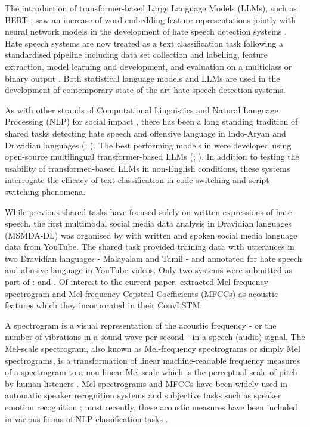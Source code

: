 \documentclass[11pt]{article}
\begin{document}
    The introduction of transformer-based Large Language Models (LLMs), such as BERT \cite{devlin_bert_2019}, saw an increase of word embedding feature representations jointly with neural network models in the development of hate speech detection systems \cite{jahan_systematic_2023}. Hate speech systems are now treated as a text classification task following a standardised pipeline including data set collection and labelling, feature extraction, model learning and development, and evaluation on a multiclass or binary output \cite{rawat_hate_2024}. Both statistical language models and LLMs are used in the development of contemporary state-of-the-art hate speech detection systems.
    
    As with other strands of Computational Linguistics and Natural Language Processing (NLP) for social impact \cite{hovy_social_2016}, there has been a long standing tradition of shared tasks detecting hate speech and offensive language in Indo-Aryan and Dravidian languages (\citealp{chakravarthi_findings_2021}; \citealp{chakravarthi_overview_2022}). The best performing models in \citet{chakravarthi_overview_2024} were developed using open-source multilingual transformer-based LLMs (\citealp{conneau_unsupervised_2020}; \citealp{khanuja_muril_2021}). In addition to testing the usability of transformed-based LLMs in non-English conditions, these systems interrogate the efficacy of text classification in code-switching \cite{yasaswini_iiittdravidianlangtech-eacl2021_2021} and script-switching \cite{wong_cantnlplt-edi-2024_2024} phenomena.
    
    While previous shared tasks have focused solely on written expressions of hate speech, the first multimodal social media data analysis in Dravidian languages (MSMDA-DL) was organised by \citet{chakravarthi_findings_2024} with written and spoken social media language data from YouTube. The shared task provided training data with utterances in two Dravidian languages - Malayalam and Tamil - and annotated for hate speech and abusive language in YouTube videos. Only two systems were submitted as part of \citet{chakravarthi_findings_2024}: \citet{rahman_binary_beastsdravidianlangtech-eacl_2024} and \citet{s_wit_2024}. Of interest to the current paper, \citet{rahman_binary_beastsdravidianlangtech-eacl_2024} extracted Mel-frequency spectrogram and Mel-frequency Cepstral Coefficients (MFCCs) as acoustic features which they incorporated in their ConvLSTM.

    A spectrogram is a visual representation of the acoustic frequency - or the number of vibrations in a sound wave per second - in a speech (audio) signal. The Mel-scale spectrogram, also known as Mel-frequency spectrograms or simply Mel spectrograms, is a transformation of linear machine-readable frequency measures of a spectrogram to a non-linear Mel scale which is the perceptual scale of pitch by human listeners \cite{stevens_scale_1937}. Mel spectrograms and MFCCs \cite{davis_comparison_1980} have been widely used in automatic speaker recognition systems and subjective tasks such as speaker emotion recognition \cite{zhou_exploring_2019}; most recently, these acoustic measures have been included in various forms of NLP classification tasks \cite{arroniz_was_2023}.
\end{document}
